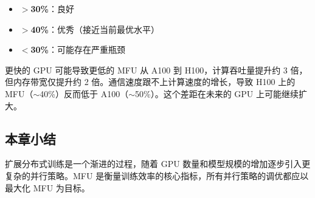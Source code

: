 \begin{itemize}
    \item \textbf{$>$30\%}：良好
    \item \textbf{$>$40\%}：优秀（接近当前最优水平）
    \item \textbf{$<$30\%}：可能存在严重瓶颈
\end{itemize}

\begin{warningbox}{更快的 GPU 可能导致更低的 MFU}
从 A100 到 H100，计算吞吐量提升约 3 倍，但内存带宽仅提升约 2 倍。通信速度跟不上计算速度的增长，导致 H100 上的 MFU（$\sim$40\%）反而低于 A100（$\sim$50\%）。这个差距在未来的 GPU 上可能继续扩大。
\end{warningbox}

\subsection{本章小结}

扩展分布式训练是一个渐进的过程，随着 GPU 数量和模型规模的增加逐步引入更复杂的并行策略。MFU 是衡量训练效率的核心指标，所有并行策略的调优都应以最大化 MFU 为目标。


